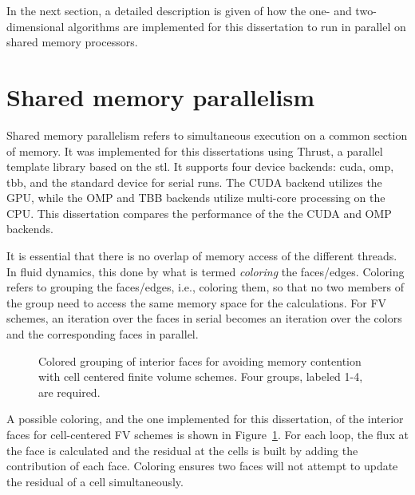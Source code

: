 In the next section, a detailed description is given of how the one- and two-dimensional algorithms are implemented for this dissertation to run in parallel on shared memory processors.

\section[Shared memory parallelism]{Shared memory parallelism}
\label{sec:shared_memory}

Shared memory parallelism refers to simultaneous execution on a common section of memory.  It was implemented for this dissertations using Thrust, a \cpp  parallel template library based on the \gls{stl}.  It supports four device backends: \gls{cuda}, \gls{omp}, \gls{tbb}, and the standard \cpp device for serial runs.  The CUDA backend utilizes the GPU, while the OMP and TBB backends utilize multi-core processing on the CPU.  This dissertation compares the performance of the the CUDA and OMP backends.

It is essential that there is no overlap of memory access of the different threads.  In fluid dynamics, this done by what is termed \emph{coloring} the faces/edges.  Coloring refers to grouping the faces/edges, i.e., coloring them, so that no two members of the group need to access the same memory space for the calculations.  For FV schemes, an iteration over the faces in serial becomes an iteration over the colors and the corresponding faces in parallel. 

\begin{figure}[htbp]\figSpace
\begin{center}

\end{center}
\caption{Colored grouping of interior faces for avoiding memory contention with cell centered finite volume schemes.  Four groups, labeled 1-4, are required.}
\label{fig:face_color_1}
\figSpace
\end{figure}

A possible coloring, and the one implemented for this dissertation, of the interior faces for cell-centered FV schemes is shown in Figure~\ref{fig:face_color_1}.  For each loop, the flux at the face is calculated and the residual at the cells is built by adding the contribution of each face.  Coloring ensures two faces will not attempt to update the residual of a cell simultaneously.

